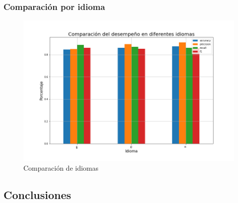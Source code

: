 \subsubsection{Comparación por idioma}
\begin{figure}
    \centering
    \includegraphics[width=\textwidth]{results/FakeNewsDetection/language_comparison.png}
    \caption{Comparación de idiomas}
    \label{fig:fake_news_languages}
\end{figure}

\subsection{Conclusiones}

